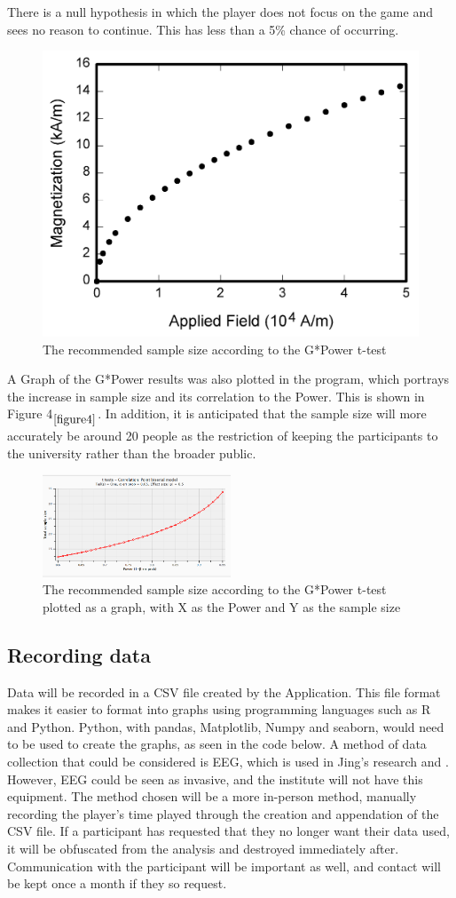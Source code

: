 \documentclass[conference]{IEEEtran}
\begin{document}
There is a null hypothesis in which the player does not focus on the game and sees no reason to continue. This has less than a 5\% chance of occurring.
\begin{figure}[H]
\includegraphics[width =0.5 \textwidth]{fig1}
\caption{The recommended sample size according to the G*Power t-test}
\label{figure4}
\end{figure}

A Graph of the G*Power results was also plotted in the program, which portrays the increase in sample size and its correlation to the Power. This is shown in Figure 4$_{\ref{figure4}}$. In addition, it is anticipated that the sample size will more accurately be around 20 people as the restriction of keeping the participants to the university rather than the broader public. 

\begin{figure}[H]
\includegraphics[width = 0.5\textwidth]{fig2}
\caption{The recommended sample size according to the G*Power t-test plotted as a graph, with X as the Power and Y as the sample size}
\label{figure5}
\end{figure}

\subsection{Recording data}
Data will be recorded in a CSV file created by the Application. This file format makes it easier to format into graphs using programming languages such as R and Python. Python, with pandas, Matplotlib, Numpy and seaborn, would need to be used to create the graphs, as seen in the code below. A method of data collection that could be considered is EEG, which is used in Jing’s research \cite{Jing2024} and \cite{Ruqeyya2022}. However, EEG could be seen as invasive, and the institute will not have this equipment. The method chosen will be a more in-person method, manually recording the player’s time played through the creation and appendation of the CSV file. If a participant has requested that they no longer want their data used, it will be obfuscated from the analysis and destroyed immediately after. Communication with the participant will be important as well, and contact will be kept once a month if they so request.\\
\end{document}
